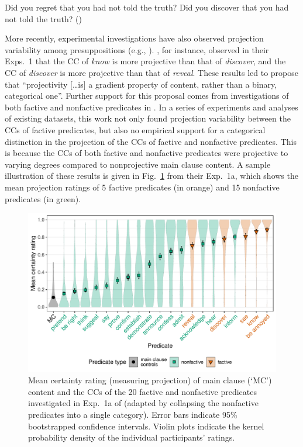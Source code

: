 \documentclass[11pt,fleqn]{article}
\newcommand{\6}{\mbox{$[\hspace*{-.6mm}[$}}
\newcommand{\9}{\mbox{$]\hspace*{-.6mm}]$}}
\begin{document}
\begin{exe}
\ex\label{kart}
\begin{xlist}
\ex Did you regret that you had not told the truth?
\ex Did you discover that you had not told the truth? \hfill (\citealt[63]{karttunen71b})
\end{xlist}
\end{exe}
More recently, experimental investigations have also observed projection variability among presuppositions (e.g., \citealt*{xue-onea11,demarneffe-etal-sub23,tbd-variability,degen-tonhauser-language}). \citealt{tbd-variability}, for instance, observed in their Exps.~1 that the CC of {\em know} is more projective than that of {\em discover}, and the CC of {\em discover} is more projective than that of {\em reveal}. These results led \citealt[498]{tbd-variability} to propose that ``projectivity [\ldots is] a gradient property of content, rather than a binary, categorical one''. Further support for this proposal comes from  investigations of both factive and nonfactive predicates in \citealt{degen-tonhauser-language}. In a series of experiments and analyses of existing datasets, this work not only found projection variability between the CCs of factive predicates, but also no empirical support for a categorical distinction in the projection of the CCs of factive and nonfactive predicates. This is because the CCs of both factive and nonfactive predicates were projective to varying degrees compared to nonprojective main clause content. A sample illustration of these results is given in Fig.~\ref{fig:dt1a} from their Exp.~1a, which shows the mean projection ratings of 5 factive predicates (in \color{orange}orange\color{black}) and 15 nonfactive predicates (in \color{green}green\color{black}).

\begin{figure}[h!]
\centering
\includegraphics[width=.8\textwidth]{../../results/main/13explicitIgnorance/graphs/mean-certainty-by-predicateType}
\caption{Mean certainty rating (measuring projection) of main clause (`MC') content and the CCs of the 20 \color{orange}factive \color{black} and \color{green}nonfactive \color{black} predicates investigated in Exp.~1a of \citealt{degen-tonhauser-language} (adapted by collapsing the nonfactive predicates into a single category). Error bars indicate 95\% bootstrapped confidence intervals. Violin plots indicate the kernel probability density of the individual participants' ratings.}\label{fig:dt1a}
\end{figure}
\end{document}
